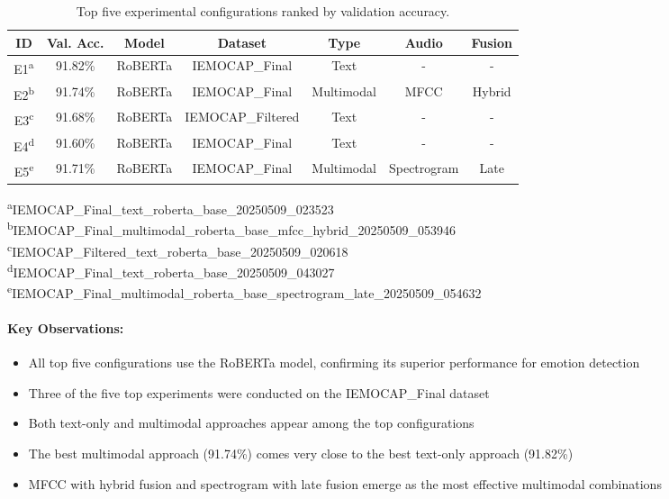 \documentclass[12pt]{article}
\begin{document}
\begin{table}[h]
\centering
\caption{Top five experimental configurations ranked by validation accuracy.}
\label{tab:top_experiments}
\renewcommand{\arraystretch}{1.4}
\begin{tabular}{|c|c|c|c|c|c|c|}
\hline
\textbf{ID} & \textbf{Val. Acc.} & \textbf{Model} & \textbf{Dataset} & \textbf{Type} & \textbf{Audio} & \textbf{Fusion} \\
\hline
E1\textsuperscript{a} & 91.82\% & RoBERTa & IEMOCAP\_Final & Text & - & - \\
\hline
E2\textsuperscript{b} & 91.74\% & RoBERTa & IEMOCAP\_Final & Multimodal & MFCC & Hybrid \\
\hline
E3\textsuperscript{c} & 91.68\% & RoBERTa & IEMOCAP\_Filtered & Text & - & - \\
\hline
E4\textsuperscript{d} & 91.60\% & RoBERTa & IEMOCAP\_Final & Text & - & - \\
\hline
E5\textsuperscript{e} & 91.71\% & RoBERTa & IEMOCAP\_Final & Multimodal & Spectrogram & Late \\
\hline
\end{tabular}
\vspace{1mm}
\small
\begin{flushleft}
\textsuperscript{a}IEMOCAP\_Final\_text\_roberta\_base\_20250509\_023523\\
\textsuperscript{b}IEMOCAP\_Final\_multimodal\_roberta\_base\_mfcc\_hybrid\_20250509\_053946\\
\textsuperscript{c}IEMOCAP\_Filtered\_text\_roberta\_base\_20250509\_020618\\
\textsuperscript{d}IEMOCAP\_Final\_text\_roberta\_base\_20250509\_043027\\
\textsuperscript{e}IEMOCAP\_Final\_multimodal\_roberta\_base\_spectrogram\_late\_20250509\_054632
\end{flushleft}
\end{table}

\paragraph{Key Observations:}
\begin{itemize}
    \item All top five configurations use the RoBERTa model, confirming its superior performance for emotion detection
    \item Three of the five top experiments were conducted on the IEMOCAP\_Final dataset
    \item Both text-only and multimodal approaches appear among the top configurations
    \item The best multimodal approach (91.74\%) comes very close to the best text-only approach (91.82\%)
    \item MFCC with hybrid fusion and spectrogram with late fusion emerge as the most effective multimodal combinations
\end{itemize}
\end{document}
